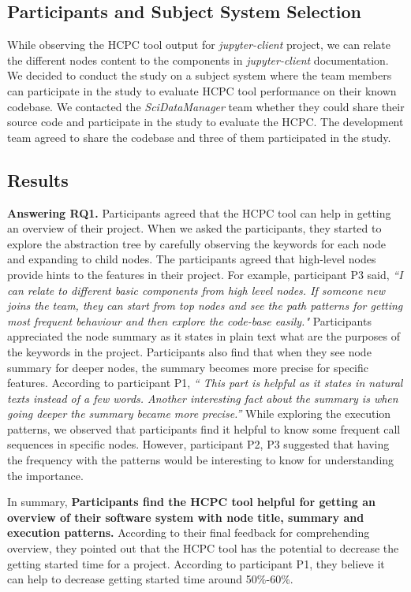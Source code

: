 \subsection{Participants and Subject System Selection}
While observing the HCPC tool output for \emph{jupyter-client} project, we can relate the different nodes content to the components in \emph{jupyter-client} documentation. We decided to conduct the study on a subject system where the team members can participate in the study to evaluate HCPC tool performance on their known codebase. We contacted the \emph{SciDataManager} team whether they could share their source code and participate in the study to evaluate the HCPC. The development team agreed to share the codebase and three of them participated in the study. 
\subsection{Results}
\textbf{Answering RQ1.} Participants agreed that the HCPC tool can help in getting an overview of their project. When we asked the participants, they started to explore the abstraction tree by carefully observing the keywords for each node and expanding to child nodes. The participants agreed that high-level nodes provide hints to the features in their project. For example, participant P3 said, \emph{``I can relate to different basic components from high level nodes. If someone new joins the team, they can start from top nodes and see the path patterns for getting most frequent behaviour and then explore the code-base easily."} Participants appreciated the node summary as it states in plain text what are the purposes of the keywords in the project. Participants also find that when they see node summary for deeper nodes, the summary becomes more precise for specific features. 
According to participant P1, \emph{`` This part is helpful as it states in natural texts instead of a few words. Another interesting fact about the summary is when going deeper the summary became more precise.''} While exploring the execution patterns, we observed that participants find it helpful to know some frequent call sequences in specific nodes. However, participant P2, P3 suggested that having the frequency with the patterns would be interesting to know for understanding the importance. 

In summary, \textbf{Participants find the HCPC tool helpful for getting an overview of their software system with node title, summary and execution patterns.} According to their final feedback for comprehending overview, they pointed out that the HCPC tool has the potential to decrease the getting started time for a project. According to participant P1, they believe  it can help to decrease getting started time around 50\%-60\%.

